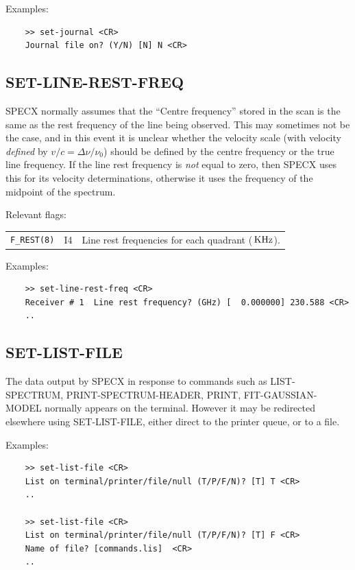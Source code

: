 \documentclass[11pt,twoside]{report}
\begin{document}
Examples:
\begin{verbatim}
    >> set-journal <CR>
    Journal file on? (Y/N) [N] N <CR>
\end{verbatim}

\subsection{SET-LINE-REST-FREQ} 

SPECX normally assumes that the ``Centre frequency'' stored in the scan
is the same as the rest frequency of the line being observed. This may 
sometimes not be the case, and in this event it is unclear whether the 
velocity scale (with velocity {\em defined} by $v/c = \Delta\nu/\nu_0$)
should be defined by the centre frequency or the true line frequency.
If the line rest frequency is {\em not} equal to zero, then SPECX uses
this for its velocity determinations, otherwise it uses the frequency
of the midpoint of the spectrum.

Relevant flags:\\
\begin{tabular}{lll}
  \verb+F_REST(8)+ & I4 & Line rest frequencies for each quadrant (${\rm\,KHz}$).
\end{tabular}

Examples:
\begin{verbatim}
    >> set-line-rest-freq <CR>
    Receiver # 1  Line rest frequency? (GHz) [  0.000000] 230.588 <CR>
    ..
\end{verbatim}

\subsection{SET-LIST-FILE} 

The data output by SPECX in response to commands such as LIST-SPECTRUM,
PRINT-SPECTRUM-HEADER, PRINT, FIT-GAUSSIAN-MODEL \etc
normally appears on the terminal. However it may be
redirected elsewhere using SET-LIST-FILE, either direct to the printer queue,
or to a file. 

Examples:
\begin{verbatim}
    >> set-list-file <CR>
    List on terminal/printer/file/null (T/P/F/N)? [T] T <CR>
    ..

    >> set-list-file <CR>
    List on terminal/printer/file/null (T/P/F/N)? [T] F <CR>
    Name of file? [commands.lis]  <CR>
    ..
\end{verbatim}
\end{document}
